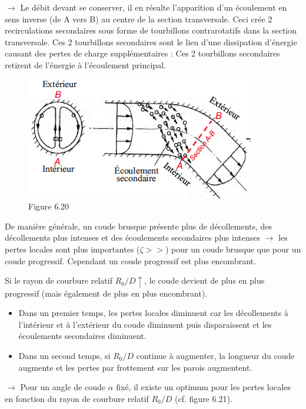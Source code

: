 $\rightarrow$ Le débit devant se conserver, il en résulte l’apparition d’un écoulement en sens inverse (de A vers B) au centre de la section transversale. Ceci crée 2 recirculations secondaires sous forme de tourbillons contrarotatifs dans la section transversale. Ces 2 tourbillons secondaires sont le lieu d’une dissipation d’énergie causant des pertes de charge supplémentaires : Ces 2 tourbillons secondaires retirent de l’énergie à l’écoulement principal.

\begin{figure}[H]
\begin{center}
\includegraphics[scale=0.50]{ch6/82.png}
\caption*{Figure 6.20}
\end{center}
\end{figure}

De manière générale, un coude brusque présente plus de décollements, des décollements plus intenses et des écoulements secondaires plus intenses $ \rightarrow $ les pertes locales sont plus importantes ($ \zeta >> $) pour un coude brusque que pour un coude progressif. Cependant un coude progressif est plus encombrant.

Si le rayon de courbure relatif $R_0/D \uparrow$, le coude devient de plus en plus progressif (mais également de plus en plus encombrant).
\begin{itemize}
\item Dans un premier temps, les pertes locales diminuent car les décollements à l’intérieur et à l’extérieur du coude diminuent puis disparaissent et les écoulements secondaires diminuent.
\item Dans un second temps, si $R_0/D$ continue à augmenter, la longueur du coude augmente et les pertes par frottement sur les parois augmentent.
\end{itemize}
 $\rightarrow $ Pour un angle de coude $\alpha $ fixé, il existe un optimum pour les pertes locales en fonction du rayon de courbure relatif $R_0/D$ (cf. figure 6.21).
 
